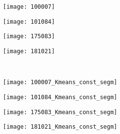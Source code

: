 \begin{figure}[!ht]
         
    \begin{subfigure}[t]{\textwidth+20pt\relax}
    	\centering
    	\texttt{[image: 100007]} 
    \end{subfigure}      
    \begin{subfigure}[b]{0.23\textwidth}
    	\centering
        \texttt{[image: 101084]}
    \end{subfigure}
    \begin{subfigure}[b]{0.23\textwidth}
    	\centering
        \texttt{[image: 175083]}
    \end{subfigure}
    \begin{subfigure}[b]{0.23\textwidth}
    	\centering
        \texttt{[image: 181021]}
    \end{subfigure} \\ 
    
    \begin{subfigure}[t]{\textwidth+20pt\relax}
    	\centering
    	\texttt{[image: 100007\_Kmeans\_const\_segm]} 
    \end{subfigure}      
    \begin{subfigure}[b]{0.23\textwidth}
    	\centering
        \texttt{[image: 101084\_Kmeans\_const\_segm]}
    \end{subfigure}
    \begin{subfigure}[b]{0.23\textwidth}
    	\centering
        \texttt{[image: 175083\_Kmeans\_const\_segm]}
    \end{subfigure}
    \begin{subfigure}[b]{0.23\textwidth}
    	\centering
        \texttt{[image: 181021\_Kmeans\_const\_segm]}
    \end{subfigure} \\ 
       

\end{figure}
